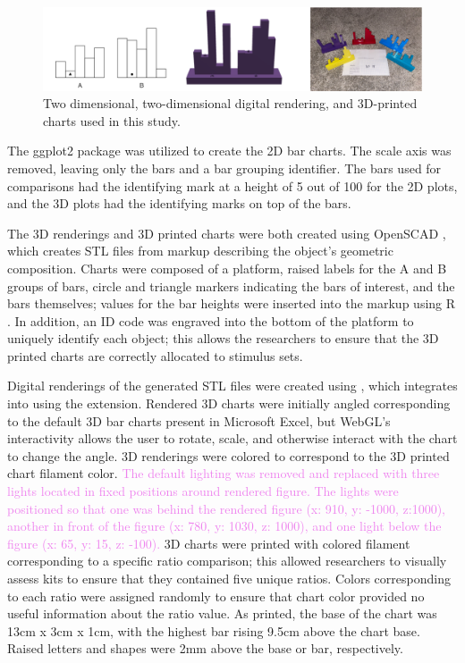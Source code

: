 \documentclass[letterpaper,inpress,dvipsnames]{jdsart}
\begin{document}
\begin{figure}
\includegraphics[width=1\linewidth]{plot-types} \caption{Two dimensional, two-dimensional digital rendering, and 3D-printed charts used in this study.}\label{fig:plotTypes}
\end{figure}

The ggplot2 \citep{ggplot2} package was utilized to create the 2D bar charts.
The scale axis was removed, leaving only the bars and a bar grouping identifier.
The bars used for comparisons had the identifying mark at a height of 5 out of 100 for the 2D plots, and the 3D plots had the identifying marks on top of the bars.

The 3D renderings and 3D printed charts were both created using OpenSCAD \citep{kintelOpenSCADDocumentation2023}, which creates STL files from markup describing the object's geometric composition.
Charts were composed of a platform, raised labels for the A and B groups of bars, circle and triangle markers indicating the bars of interest, and the bars themselves; values for the bar heights were inserted into the markup using R \citep{R}.
In addition, an ID code was engraved into the bottom of the platform to uniquely identify each object; this allows the researchers to ensure that the 3D printed charts are correctly allocated to stimulus sets.

Digital renderings of the generated STL files were created using \citet{rgl} , which integrates into \citet{shiny} using the \citet{mozillafoundationWebGL2D3D2023} extension.
Rendered 3D charts were initially angled corresponding to the default 3D bar charts present in Microsoft Excel, but WebGL's interactivity allows the user to rotate, scale, and otherwise interact with the chart to change the angle. 3D renderings were colored to correspond to the 3D printed chart filament color.
{\textcolor{Violet}{The default lighting was removed and replaced with three lights located in fixed positions around rendered figure. The lights were positioned so that one was  behind the rendered figure (x: 910, y: -1000, z:1000), another in front of the figure (x: 780, y: 1030, z: 1000), and one light below the figure (x: 65, y: 15, z: -100).}}
3D charts were printed with colored filament corresponding to a specific ratio comparison; this allowed researchers to visually assess kits to ensure that they contained five unique ratios.
Colors corresponding to each ratio were assigned randomly to ensure that chart color provided no useful information about the ratio value.
As printed, the base of the chart was 13cm x 3cm x 1cm, with the highest bar rising 9.5cm above the chart base.
Raised letters and shapes were 2mm above the base or bar, respectively.
\end{document}
